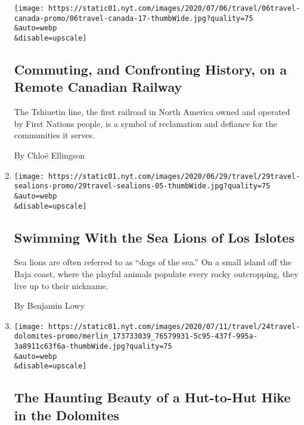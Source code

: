 \begin{enumerate}
  \texttt{[image: https://static01.nyt.com/images/2020/07/06/travel/06travel-canada-promo/06travel-canada-17-thumbWide.jpg?quality=75\\\&auto=webp\\\&disable=upscale]}

  \hypertarget{commuting-and-confronting-history-on-a-remote-canadian-railway}{%
  \subsection{Commuting, and Confronting History, on a Remote Canadian
  Railway}\label{commuting-and-confronting-history-on-a-remote-canadian-railway}}

  The Tshiuetin line, the first railroad in North America owned and
  operated by First Nations people, is a symbol of reclamation and
  defiance for the communities it serves.

  By Chloë Ellingson
\item
  \href{/2020/06/29/travel/sea-lions-los-islotes.html}{}

  \texttt{[image: https://static01.nyt.com/images/2020/06/29/travel/29travel-sealions-promo/29travel-sealions-05-thumbWide.jpg?quality=75\\\&auto=webp\\\&disable=upscale]}

  \hypertarget{swimming-with-the-sea-lions-of-los-islotes}{%
  \subsection{Swimming With the Sea Lions of Los
  Islotes}\label{swimming-with-the-sea-lions-of-los-islotes}}

  Sea lions are often referred to as ``dogs of the sea.'' On a small
  island off the Baja coast, where the playful animals populate every
  rocky outcropping, they live up to their nickname.

  By Benjamin Lowy
\item
  \href{/2020/06/24/travel/dolomites-italy-hut-hiking.html}{}

  \texttt{[image: https://static01.nyt.com/images/2020/07/11/travel/24travel-dolomites-promo/merlin\_173733039\_76579931-5c95-437f-995a-3a8911c63f6a-thumbWide.jpg?quality=75\\\&auto=webp\\\&disable=upscale]}

  \hypertarget{the-haunting-beauty-of-a-hut-to-hut-hike-in-the-dolomites}{%
  \subsection{The Haunting Beauty of a Hut-to-Hut Hike in the
  Dolomites}\label{the-haunting-beauty-of-a-hut-to-hut-hike-in-the-dolomites}}


\end{enumerate}
